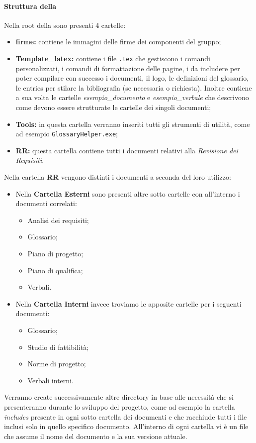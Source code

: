 \paragraph{Struttura della }
Nella root della  sono presenti 4 cartelle: 
\begin{itemize}
	\item \textbf{firme:} contiene le immagini delle firme dei componenti del gruppo;
	\item \textbf{Template\_{}latex:} contiene i file \texttt{.tex} che gestiscono i comandi personalizzati, i comandi di formattazione delle pagine, i  da includere per poter compilare con successo i documenti, il logo, le definizioni del glossario, le entries per stilare la bibliografia (se necessaria o richiesta). Inoltre contiene a sua volta le cartelle \emph{esempio\_{}documento} e \emph{esempio\_{}verbale} che descrivono come devono essere strutturate le cartelle dei singoli documenti;
	\item \textbf{Tools:} in questa cartella verranno inseriti tutti gli strumenti di utilità, come ad esempio \texttt{GlossaryHelper.exe};
	\item \textbf{RR:} questa cartella contiene tutti i documenti relativi alla \textit{Revisione dei Requisiti}.
\end{itemize}
Nella cartella \textbf{RR} vengono distinti i documenti a seconda del loro utilizzo:
\begin{itemize}
	\item Nella \textbf{Cartella Esterni} sono presenti altre sotto cartelle con all'interno i documenti correlati:
	\begin{itemize}
		\item Analisi dei requisiti;
		\item Glossario;
		\item Piano di progetto;
		\item Piano di qualifica;
		\item Verbali.
	\end{itemize}
	\item Nella \textbf{Cartella Interni} invece troviamo le apposite cartelle per i seguenti documenti:
	\begin{itemize}
		\item Glossario;
		\item Studio di fattibilità; 
		\item Norme di progetto;
		\item Verbali interni.
	\end{itemize}
\end{itemize}
Verranno create successivamente altre directory in base alle necessità che si presenteranno durante lo sviluppo del progetto, come ad esempio la cartella \emph{includes} presente in ogni sotto cartella dei documenti e che racchiude tutti i file inclusi solo in quello specifico documento. All’interno di ogni cartella vi è un file  che assume il nome del documento e la sua versione attuale.

